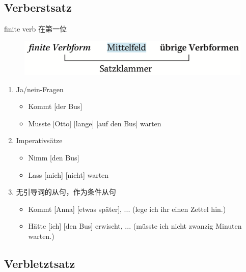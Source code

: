 \documentclass[UTF8]{report}
\begin{document}
\subsection{Verberstsatz}
finite verb 在第一位
\begin{figure}[H]
    \centering
    \includegraphics[scale=0.5]{w2.png}
\end{figure}
\begin{enumerate}
    \item Ja/nein-Fragen
    \begin{itemize}
        \item Kommt [der Bus]
        \item Musste [Otto] [lange] [auf den Bus] warten
    \end{itemize}
    \item Imperativsätze
    \begin{itemize}
        \item Nimm [den Bus]
        \item Lass [mich] [nicht] warten
    \end{itemize}
    \item 无引导词的从句，作为条件从句
    \begin{itemize}
        \item Kommt [Anna] [etwas später], ... (lege ich ihr einen Zettel hin.)
        \item Hätte [ich] [den Bus] erwischt, ... (müsste ich nicht zwanzig Minuten warten.)
    \end{itemize}
\end{enumerate}

\subsection{Verbletztsatz}
\end{document}
